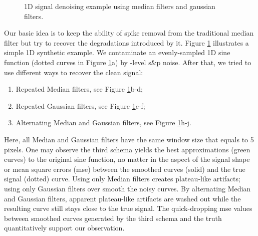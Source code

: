 \documentclass[journal]{IEEEtran}
\begin{document}
\begin{figure}
  \centering
  \caption{1D signal denoising example using median filters and gaussian filters.
    }\label{fig:1dExample}
\end{figure}

Our basic idea is to keep the ability of spike removal from the traditional median filter but try to recover the degradations introduced by it. Figure \ref{fig:1dExample} illustrates a simple 1D synthetic example. We contaminate an evenly-sampled 1D sine function (dotted curves in Figure \ref{fig:1dExample}a) by -level s\&p noise. After that, we tried to use different ways to recover the clean signal:
\begin{enumerate}
  \item Repeated Median filters, see Figure \ref{fig:1dExample}b-d;
  \item Repeated Gaussian filters, see Figure \ref{fig:1dExample}e-f;
  \item Alternating Median and Gaussian filters, see Figure \ref{fig:1dExample}h-j.
\end{enumerate}
Here, all Median and Gaussian filters have the same window size that equals to 5 pixels. One may observe the third schema yields the best approximations (green curves) to the original sine function, no matter in the aspect of the signal shape or mean square errors (mse) between the smoothed curves (solid) and the true signal (dotted) curve. Using only Median filters creates plateau-like artifacts; using only Gaussian filters over smooth the noisy curves. By alternating Median and Gaussian filters, apparent plateau-like artifacts are washed out while the resulting curve still stays close to the true signal. The quick-dropping mse values between smoothed curves generated by the third schema and the truth quantitatively support our observation.
\end{document}
